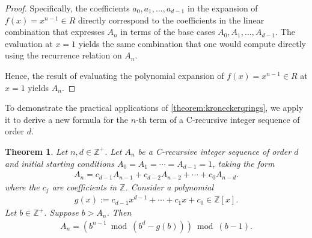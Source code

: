 \documentclass[12pt]{article}
\theoremstyle{plain}
\newtheorem{theorem}{Theorem}
\theoremstyle{definition}
\begin{document}
\begin{proof}
Specifically, the coefficients $a_0, a_1, \ldots, a_{d-1}$ in the expansion of $f(x) = x^{n-1} \in R$ directly correspond to the coefficients in the linear combination that expresses $A_n$ in terms of the base cases $A_0, A_1, \ldots, A_{d-1}$. The evaluation at $x=1$ yields the same combination that one would compute directly using the recurrence relation on $A_n$.

Hence, the result of evaluating the polynomial expansion of $f(x) = x^{n-1} \in R$ at $x=1$ yields $A_n$.
\end{proof}

To demonstrate the practical applications of \cref{theorem:kroneckerqrings}, we apply it to derive a new formula for the $n$-th term of a C-recursive integer sequence of order $d$.

\begin{theorem} \label{theorem:recurrences}
Let $n,d \in \mathbb{Z}^+$. Let $A_n$ be a C-recursive integer sequence of order $d$ and initial starting conditions $A_0=A_1=\cdots=A_{d-1}=1$, taking the form
\begin{align*}
    A_{n} = c_{d-1} A_{n-1} + c_{d-2} A_{n-2} + \cdots + c_{0} A_{n-d} .
\end{align*}
where the $c_j$ are coefficients in $\mathbb{Z}$. Consider a polynomial
\begin{align*}
    g(x) := c_{d-1} x^{d-1} + \cdots + c_1 x + c_0 \in \mathbb{Z}[x] .
\end{align*}
Let $b \in \mathbb{Z}^+$. Suppose $b > A_n$. Then
\begin{align*}
    A_{n} = \left(b^{n-1} \bmod{(b^d - g(b))}\right) \bmod{(b-1)} .
\end{align*}
\end{theorem}
\end{document}
